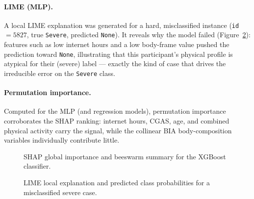 \paragraph{LIME (MLP).} A local LIME explanation was generated for a hard, misclassified instance (\texttt{id}$=5827$, true \texttt{Severe}, predicted \texttt{None}). It reveals why the model failed (Figure~\ref{fig:cmi_lime}): features such as low internet hours and a low body-frame value pushed the prediction toward \texttt{None}, illustrating that this participant's physical profile is atypical for their (severe) label --- exactly the kind of case that drives the irreducible error on the \texttt{Severe} class.\\

\paragraph{Permutation importance.} Computed for the MLP (and regression models), permutation importance corroborates the SHAP ranking: internet hours, CGAS, age, and combined physical activity carry the signal, while the collinear BIA body-composition variables individually contribute little.\\

\begin{figure}[h]
    \centering
    \caption{SHAP global importance and beeswarm summary for the XGBoost classifier.}
    \label{fig:cmi_shap}
\end{figure}

\begin{figure}[h]
    \centering
    \caption{LIME local explanation and predicted class probabilities for a misclassified severe case.}
    \label{fig:cmi_lime}
\end{figure}


